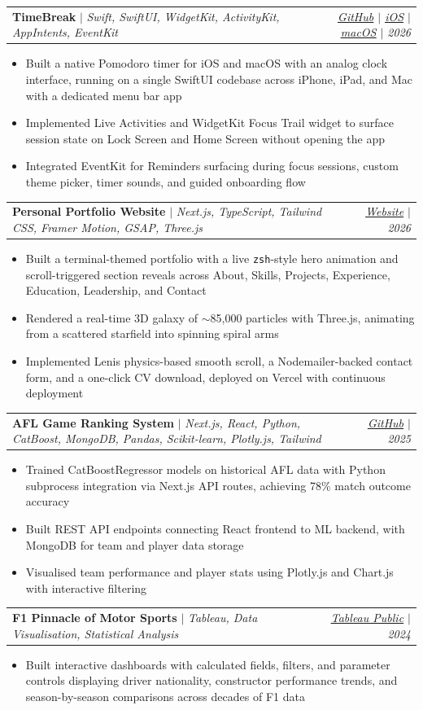 \documentclass[letterpaper,11pt]{article}
\makeatletter
\newcommand{\resumeItem}[1]{
  \item\small{#1 \vspace{-2pt}}
}
\newcommand{\resumeProjectHeading}[2]{
    \item
    \begin{tabular*}{0.97\textwidth}{l@{\extracolsep{\fill}}r}
      \small#1 & \textit{\small #2} \\
    \end{tabular*}\vspace{-7pt}
}
\newcommand{\resumeItemListStart}{\begin{itemize}}
\newcommand{\resumeItemListEnd}{\end{itemize}\vspace{-5pt}}
\makeatother
\begin{document}
    \resumeProjectHeading
      {\textbf{TimeBreak} $|$ \emph{Swift, SwiftUI, WidgetKit, ActivityKit, AppIntents, EventKit}}{\href{https://github.com/ekramjim/timeBreak}{\underline{GitHub}} $|$ \href{https://apps.apple.com/au/app/timebreak-pomodoro/id6763444390}{\underline{iOS}} $|$ \href{https://apps.apple.com/au/app/timebreak-pomodoro/id6763444390}{\underline{macOS}} $|$ 2026}
      \resumeItemListStart
        \resumeItem{Built a native Pomodoro timer for iOS and macOS with an analog clock interface, running on a single SwiftUI codebase across iPhone, iPad, and Mac with a dedicated menu bar app}
        \resumeItem{Implemented Live Activities and WidgetKit Focus Trail widget to surface session state on Lock Screen and Home Screen without opening the app}
        \resumeItem{Integrated EventKit for Reminders surfacing during focus sessions, custom theme picker, timer sounds, and guided onboarding flow}
      \resumeItemListEnd

    \resumeProjectHeading
      {\textbf{Personal Portfolio Website} $|$ \emph{Next.js, TypeScript, Tailwind CSS, Framer Motion, GSAP, Three.js}}{\href{https://ekram.tech}{\underline{Website}} $|$ 2026}
      \resumeItemListStart
        \resumeItem{Built a terminal-themed portfolio with a live \texttt{zsh}-style hero animation and scroll-triggered section reveals across About, Skills, Projects, Experience, Education, Leadership, and Contact}
        \resumeItem{Rendered a real-time 3D galaxy of $\sim$85,000 particles with Three.js, animating from a scattered starfield into spinning spiral arms}
        \resumeItem{Implemented Lenis physics-based smooth scroll, a Nodemailer-backed contact form, and a one-click CV download, deployed on Vercel with continuous deployment}
      \resumeItemListEnd

    \resumeProjectHeading
      {\textbf{AFL Game Ranking System} $|$ \emph{Next.js, React, Python, CatBoost, MongoDB, Pandas, Scikit-learn, Plotly.js, Tailwind}}{\href{https://github.com/yeanle02/FYP}{\underline{GitHub}} $|$ 2025}
      \resumeItemListStart
        \resumeItem{Trained CatBoostRegressor models on historical AFL data with Python subprocess integration via Next.js API routes, achieving 78\% match outcome accuracy}
        \resumeItem{Built REST API endpoints connecting React frontend to ML backend, with MongoDB for team and player data storage}
        \resumeItem{Visualised team performance and player stats using Plotly.js and Chart.js with interactive filtering}
      \resumeItemListEnd

    \resumeProjectHeading
      {\textbf{F1 Pinnacle of Motor Sports} $|$ \emph{Tableau, Data Visualisation, Statistical Analysis}}{\href{https://public.tableau.com/app/profile/ekramul.islam/viz/Visualization1F1/Dashboard1}{\underline{Tableau Public}} $|$ 2024}
      \resumeItemListStart
        \resumeItem{Built interactive dashboards with calculated fields, filters, and parameter controls displaying driver nationality, constructor performance trends, and season-by-season comparisons across decades of F1 data}
      \resumeItemListEnd
\end{document}

